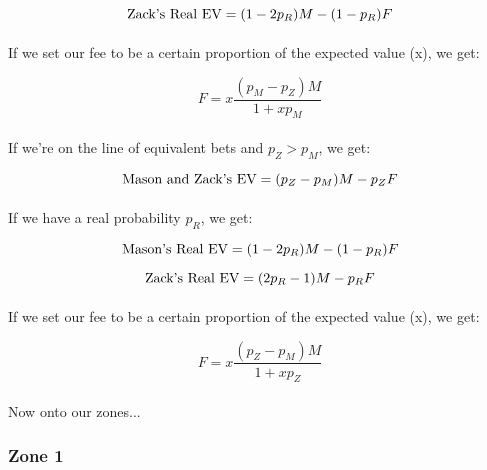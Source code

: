\documentclass[12pt,letterpaper]{article}
\begin{document}
\begin{equation}
\textnormal{Zack's Real EV} = (1- 2p_R)M - (1 - p_R) F
\end{equation}

\paragraph{} If we set our fee to be a certain proportion of the expected value (x), we get:

\begin{equation}
F = x \frac{(p_M - p_Z)M}{1 + x p_M}
\end{equation}

\paragraph{} If we’re on the line of equivalent bets and $p_Z > p_M$, we get:

\begin{equation}
\textnormal{Mason and Zack's EV} = (p_Z - p_M)M - p_Z F
\end{equation}

\paragraph{} If we have a real probability $p_R$, we get:

\begin{equation}
\textnormal{Mason's Real EV} = (1- 2p_R)M - (1 - p_R) F
\end{equation}

\begin{equation}
\textnormal{Zack's Real EV} = (2p_R - 1)M - p_R F
\end{equation}

\paragraph{} If we set our fee to be a certain proportion of the expected value (x), we get:

\begin{equation}
F = x \frac{(p_Z - p_M)M}{1 + x p_Z}
\end{equation}

\paragraph{} Now onto our zones...

\subsubsection*{Zone 1}
\end{document}
